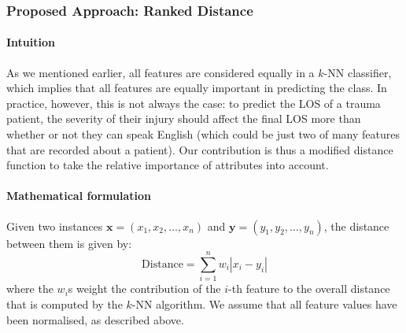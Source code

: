 \subsubsection{Proposed Approach: Ranked Distance}
\label{sec:rankeddist}
\paragraph{Intuition}
As we mentioned earlier, all features are considered equally in a $k$-NN
classifier, which implies that all features are equally important in predicting
the class. In practice, however, this is not always the case: to predict the
LOS of a trauma patient, the severity of their injury should affect the final
LOS more than whether or not they can speak English (which could be just two
of many features that are recorded about a patient). Our contribution is thus
a modified distance function to take the relative importance of attributes into
account. 

\paragraph{Mathematical formulation}
Given two instances $\mathbf{x} = (x_1,x_2,\ldots,x_n)$ and
$\mathbf{y} = (y_1,y_2,\ldots,y_n)$, the distance between them is given by:
\begin{equation*}
\mathrm{Distance} = \sum_{i=1}^n w_i |x_i-y_i|
\end{equation*}
where the $w_i$s weight the contribution of the $i$-th feature to the overall
distance that is computed by the $k$-NN algorithm. We assume that all feature
values have been normalised, as described above.

